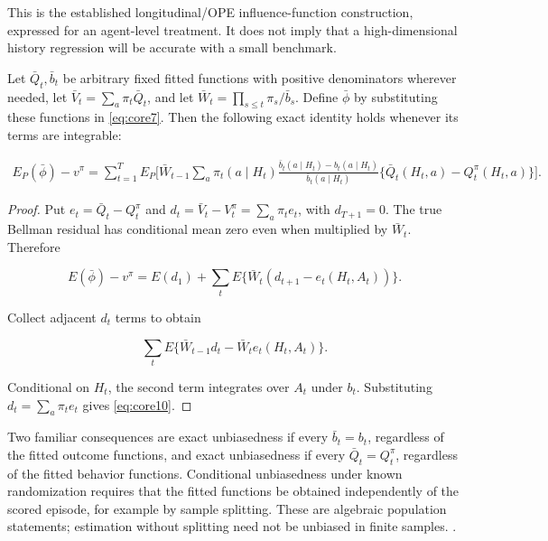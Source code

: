 This is the established longitudinal/OPE influence-function construction, expressed for an agent-level treatment. It does not imply that a high-dimensional history regression will be accurate with a small benchmark.

\begin{theorem}\label{core-result-3}
Let \(\bar Q_t,\bar b_t\) be arbitrary fixed fitted functions with positive denominators wherever needed, let \(\bar V_t=\sum_a\pi_t\bar Q_t\), and let \(\bar W_t=\prod_{s\le t}\pi_s/\bar b_s\). Define \(\bar\phi\) by substituting these functions in \eqref{eq:core7}. Then the following exact identity holds whenever its terms are integrable:

\begin{equation}\label{eq:core10}
\begin{split}
E_P(\bar\phi)-v^{\pi}
=\sum_{t=1}^{T}E_P\Bigg[\bar W_{t-1}
\sum_a\pi_t(a\mid H_t)
\frac{\bar b_t(a\mid H_t)-b_t(a\mid H_t)}{\bar b_t(a\mid H_t)}
\{\bar Q_t(H_t,a)-Q_t^{\pi}(H_t,a)\}\Bigg].
\end{split}
\end{equation}
\end{theorem}
\begin{proof}
Put \(e_t=\bar Q_t-Q_t^{\pi}\) and \(d_t=\bar V_t-V_t^{\pi}=\sum_a\pi_te_t\), with \(d_{T+1}=0\). The true Bellman residual has conditional mean zero even when multiplied by \(\bar W_t\). Therefore

\[
E(\bar\phi)-v^{\pi}
=E(d_1)+\sum_t E\{\bar W_t(d_{t+1}-e_t(H_t,A_t))\}.
\]

Collect adjacent \(d_t\) terms to obtain

\[
\sum_t E\{\bar W_{t-1}d_t-\bar W_te_t(H_t,A_t)\}.
\]

Conditional on \(H_t\), the second term integrates over \(A_t\) under \(b_t\). Substituting \(d_t=\sum_a\pi_te_t\) gives \eqref{eq:core10}.
\end{proof}

Two familiar consequences are exact unbiasedness if every \(\bar b_t=b_t\), regardless of the fitted outcome functions, and exact unbiasedness if every \(\bar Q_t=Q_t^{\pi}\), regardless of the fitted behavior functions. Conditional unbiasedness under known randomization requires that the fitted functions be obtained independently of the scored episode, for example by sample splitting. These are algebraic population statements; estimation without splitting need not be unbiased in finite samples. \citep{bang2005dr}.

